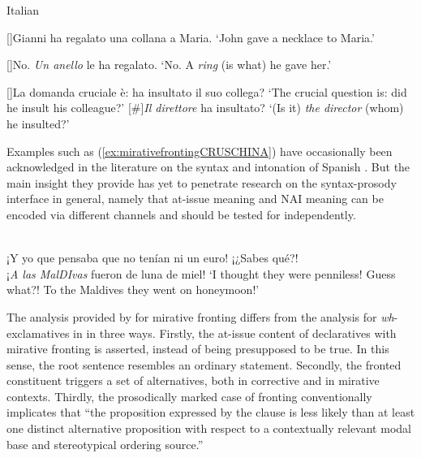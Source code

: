 \begin{exe}
\ex\label{ex:correctivefrontingITALIANassertion} Italian
\begin{xlist}[A:]
	[]{Gianni ha regalato una collana a Maria. 
	\glt `John gave a necklace to Maria.'}
	
	[]{No. \textit{Un anello} le ha regalato.
	\glt `No. A \textit{ring} (is what) he gave her.' }
\end{xlist}
\ex\label{ex:correctivefrontingITALIANquestion} 
\begin{xlist}[A:]
	[]{La domanda cruciale è: ha insultato il suo collega?
	\glt `The crucial question is: did he insult his colleague?'}
	[\#]{\textit{Il direttore} ha insultato?
	\glt `(Is it) \textit{the director} (whom) he insulted?'}
\end{xlist}
\end{exe}

Examples such as (\ref{ex:mirativefrontingCRUSCHINA}) have occasionally been acknowledged in the literature on the syntax and intonation of Spanish 
\citep{Reich.2018,Leonetti.2009}. But the main insight they provide has 
yet to penetrate research on the syntax-prosody interface in general, 
namely that at-issue meaning and \ac{NAI} meaning can be encoded via 
different channels and should be tested for independently.


\begin{exe} 
	\ex  \citet[131]{Cruschina.2019}\label{ex:mirativefrontingCRUSCHINA}\\
	¡Y yo que pensaba que no tenían ni un euro! ¡¿Sabes qué?! \\
	¡\textit{A las MalDIvas} fueron de luna de miel!
	\glt `I thought they were penniless! Guess what?! To the Maldives they went on honeymoon!'
\end{exe}

The analysis provided by \citet{BianchiBocciCruschina.2016} for mirative fronting differs from the analysis for \textit{wh}-exclamatives in \citet{ZanuttiniPortner2003} in three ways. Firstly, the at-issue content of declaratives with mirative fronting is asserted, instead of being presupposed to be true. In this sense, the root sentence resembles an ordinary statement. Secondly, the fronted constituent triggers a set of alternatives, both in corrective and in mirative contexts. Thirdly, the prosodically marked case of fronting conventionally implicates that ``the proposition expressed by the clause is less likely than at least one distinct alternative proposition with respect to a contextually relevant modal base and stereotypical ordering 
source.'' \citep[13]{BianchiBocciCruschina.2016} 

